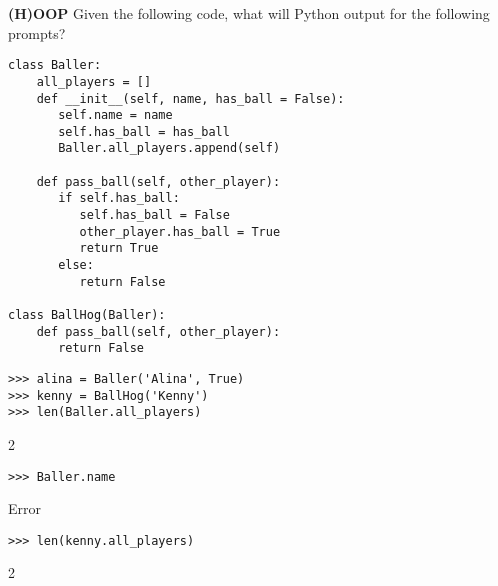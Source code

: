 \begin{blocksection}
\question \textbf{(H)OOP} \newline
Given the following code, what will Python output for the following prompts?

\begin{lstlisting}
class Baller:
    all_players = []
    def __init__(self, name, has_ball = False):
       self.name = name
       self.has_ball = has_ball
       Baller.all_players.append(self)

    def pass_ball(self, other_player):
       if self.has_ball:
          self.has_ball = False
          other_player.has_ball = True
          return True
       else:
          return False

class BallHog(Baller):
    def pass_ball(self, other_player):
       return False

\end{lstlisting}
\end{blocksection}
\begin{blocksection}

\begin{lstlisting}
>>> alina = Baller('Alina', True)
>>> kenny = BallHog('Kenny')
>>> len(Baller.all_players)
\end{lstlisting}
\begin{solution}[.2in]
2
\end{solution}

\begin{lstlisting}
>>> Baller.name
\end{lstlisting}
\begin{solution}[.2in]
Error
\end{solution}

\begin{lstlisting}
>>> len(kenny.all_players)
\end{lstlisting}
\begin{solution}[.2in]
2
\end{solution}
\end{blocksection}

